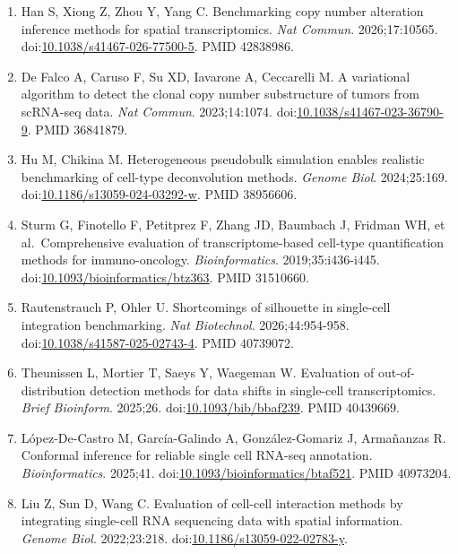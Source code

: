 \documentclass[11pt]{article}
\begin{document}
\begin{enumerate}
  doi:\href{https://doi.org/10.1038/s41467-025-62359-9}{10.1038/s41467-025-62359-9}.
  PMID 41038850.
\item
  Han S, Xiong Z, Zhou Y, Yang C. Benchmarking copy number alteration
  inference methods for spatial transcriptomics. \emph{Nat Commun}.
  2026;17:10565.
  doi:\href{https://doi.org/10.1038/s41467-026-77500-5}{10.1038/s41467-026-77500-5}.
  PMID 42838986.
\item
  De Falco A, Caruso F, Su XD, Iavarone A, Ceccarelli M. A variational
  algorithm to detect the clonal copy number substructure of tumors from
  scRNA-seq data. \emph{Nat Commun}. 2023;14:1074.
  doi:\href{https://doi.org/10.1038/s41467-023-36790-9}{10.1038/s41467-023-36790-9}.
  PMID 36841879.
\item
  Hu M, Chikina M. Heterogeneous pseudobulk simulation enables realistic
  benchmarking of cell-type deconvolution methods. \emph{Genome Biol}.
  2024;25:169.
  doi:\href{https://doi.org/10.1186/s13059-024-03292-w}{10.1186/s13059-024-03292-w}.
  PMID 38956606.
\item
  Sturm G, Finotello F, Petitprez F, Zhang JD, Baumbach J, Fridman WH,
  et al.~Comprehensive evaluation of transcriptome-based cell-type
  quantification methods for immuno-oncology. \emph{Bioinformatics}.
  2019;35:i436-i445.
  doi:\href{https://doi.org/10.1093/bioinformatics/btz363}{10.1093/bioinformatics/btz363}.
  PMID 31510660.
\item
  Rautenstrauch P, Ohler U. Shortcomings of silhouette in single-cell
  integration benchmarking. \emph{Nat Biotechnol}. 2026;44:954-958.
  doi:\href{https://doi.org/10.1038/s41587-025-02743-4}{10.1038/s41587-025-02743-4}.
  PMID 40739072.
\item
  Theunissen L, Mortier T, Saeys Y, Waegeman W. Evaluation of
  out-of-distribution detection methods for data shifts in single-cell
  transcriptomics. \emph{Brief Bioinform}. 2025;26.
  doi:\href{https://doi.org/10.1093/bib/bbaf239}{10.1093/bib/bbaf239}.
  PMID 40439669.
\item
  López-De-Castro M, García-Galindo A, González-Gomariz J, Armañanzas R.
  Conformal inference for reliable single cell RNA-seq annotation.
  \emph{Bioinformatics}. 2025;41.
  doi:\href{https://doi.org/10.1093/bioinformatics/btaf521}{10.1093/bioinformatics/btaf521}.
  PMID 40973204.
\item
  Liu Z, Sun D, Wang C. Evaluation of cell-cell interaction methods by
  integrating single-cell RNA sequencing data with spatial information.
  \emph{Genome Biol}. 2022;23:218.
  doi:\href{https://doi.org/10.1186/s13059-022-02783-y}{10.1186/s13059-022-02783-y}.

\end{enumerate}
\end{document}
